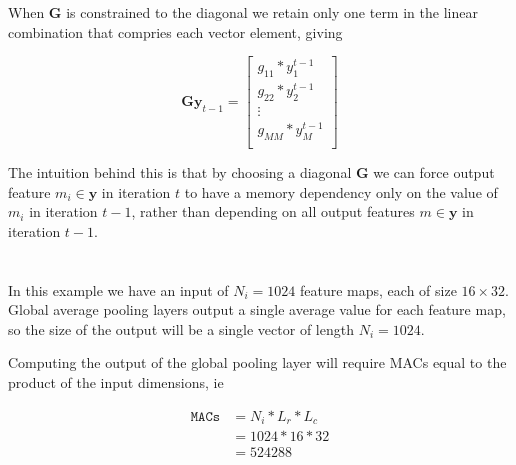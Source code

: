 \documentclass[12pt]{article}
\begin{document}
When $\boldsymbol{G}$ is constrained to the diagonal we retain only one term in
the linear combination that compries each vector element, giving

\begin{equation}
	\boldsymbol{G}\boldsymbol{y}_{t-1}
	=
	\begin{bmatrix}
		g_{11}*y^{t-1}_{1} \\
		g_{22}*y^{t-1}_{2} \\
		\vdots \\
		g_{MM}*y^{t-1}_{M} \\
	\end{bmatrix}
\end{equation}

The intuition behind this is that by choosing a diagonal $\boldsymbol{G}$ we
can force output feature $m_i \in \boldsymbol{y}$ in iteration $t$
to have a memory dependency
only on the value of $m_i$ in iteration $t-1$, rather than depending on
all output features $m \in \boldsymbol{y}$ in iteration $t-1$.

\section{}

In this example we have an input of $N_i = 1024$ feature maps, each of size $16
\times 32$. Global average pooling layers output a single average value for
each feature map, so the size of the output will be a single vector of length
$N_i=1024$.
\newline

Computing the output of the global pooling layer will require MACs equal to the
product of the input dimensions, ie

\begin{align}
	\texttt{MACs} &= N_i * L_r * L_c \\
	&= 1024 * 16 * 32 \\
	&= 524288
\end{align}
\end{document}
